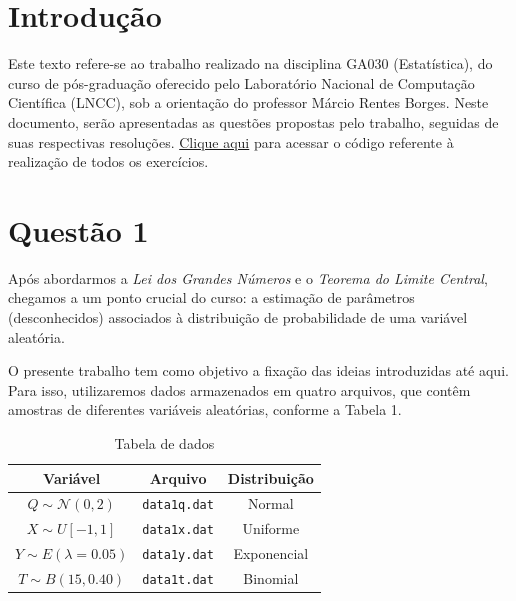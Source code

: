 \documentclass[]{abntex2}
\begin{document}
\frenchspacing 

\maketitle

\section*{\textbf{Introdução}}

Este texto refere-se ao trabalho realizado na disciplina GA030 (Estatística), do curso de pós-graduação oferecido pelo Laboratório Nacional de Computação Científica (LNCC), sob a orientação do professor Márcio Rentes Borges. Neste documento, serão apresentadas as questões propostas pelo trabalho, seguidas de suas respectivas resoluções. \href{https://github.com/lorran-araujo/LNCC/blob/main/disciplinas/estatistica/trab1/trab.ipynb}{Clique aqui} para acessar o código referente à realização de todos os exercícios.

\section*{\textbf{Questão 1}}
\noindent Após abordarmos a \textit{Lei dos Grandes Números} e o \textit{Teorema do Limite Central}, chegamos a um ponto crucial do curso: a estimação de parâmetros (desconhecidos) associados à distribuição de probabilidade de uma variável aleatória.

\noindent O presente trabalho tem como objetivo a fixação das ideias introduzidas até aqui. Para isso, utilizaremos dados armazenados em quatro arquivos, que contêm amostras de diferentes variáveis aleatórias, conforme a Tabela 1.

\begin{table}[H]
    \centering
    \begin{tabular}{|c|c|c|}
        \hline
        \textbf{Variável} & \textbf{Arquivo} & \textbf{Distribuição} \\
        \hline
        $Q \sim \mathcal{N}(0, 2)$ & \texttt{data1q.dat} & Normal \\
        $X \sim U[-1, 1]$ & \texttt{data1x.dat} & Uniforme \\
        $Y \sim E(\lambda = 0.05)$ & \texttt{data1y.dat} & Exponencial \\
        $T \sim B(15, 0.40)$ & \texttt{data1t.dat} & Binomial \\
        \hline
    \end{tabular}
    \caption{Tabela de dados}
    \label{tab:dados}
\end{table}
\end{document}
